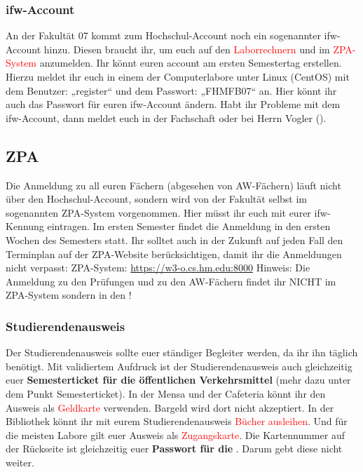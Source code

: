 \subsubsection{ifw-Account}

An der Fakultät 07 kommt zum Hochschul-Account noch ein sogenannter ifw-Account hinzu. Diesen braucht ihr, um euch auf den \textcolor{red}{Laborrechnern} und im \textcolor{red}{ZPA-System} anzumelden.\doublebreak
Ihr könnt euren account am ersten Semestertag erstellen. Hierzu meldet ihr euch in einem der Computerlabore unter Linux (CentOS) mit dem Benutzer: „register“ und dem Passwort: „FHMFB07“ an. Hier könnt ihr auch das Passwort für euren ifw-Account ändern. \doublebreak
Habt ihr Probleme mit dem ifw-Account, dann meldet euch in der Fachschaft oder bei Herrn Vogler ().

\subsection{ZPA}

Die Anmeldung zu all euren Fächern (abgesehen von AW-Fächern) läuft nicht über den Hochschul-Account, sondern wird von der Fakultät selbst im sogenannten ZPA-System vorgenommen. Hier müsst ihr euch mit eurer ifw-Kennung eintragen. Im ersten Semester findet die Anmeldung in den ersten Wochen des Semesters statt. Ihr solltet auch in der Zukunft auf jeden Fall den Terminplan auf der ZPA-Website berücksichtigen, damit ihr die Anmeldungen nicht verpasst:\doublebreak
ZPA-System: \url{https://w3-o.cs.hm.edu:8000}\doublebreak
Hinweis: Die Anmeldung zu den Prüfungen und zu den AW-Fächern findet ihr NICHT im ZPA-System sondern in den !

\subsubsection{Studierendenausweis}

Der Studierendenausweis sollte euer ständiger Begleiter werden, da ihr ihn täglich benötigt. Mit validiertem Aufdruck ist der Studierendenausweis auch gleichzeitig euer \textbf{Semesterticket für die öffentlichen Verkehrsmittel} (mehr dazu unter dem Punkt \glqq Semesterticket\grqq{}). In der Mensa und der Cafeteria könnt ihr den Ausweis als \textcolor{red}{Geldkarte} verwenden. Bargeld wird dort nicht akzeptiert. In der Bibliothek könnt ihr mit eurem Studierendenausweis \textcolor{red}{Bücher ausleihen}. Und für die meisten Labore gilt euer Ausweis als \textcolor{red}{Zugangskarte}. Die Kartennummer auf der Rückseite ist gleichzeitig euer \textbf{Passwort für die }. Darum gebt diese nicht weiter.

